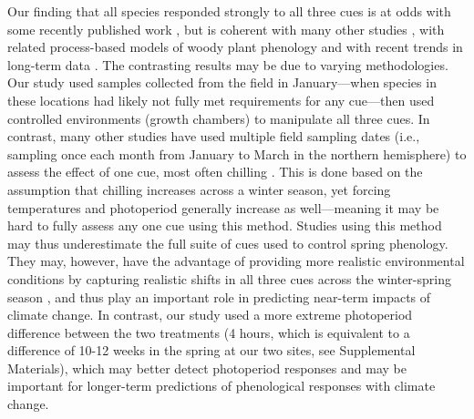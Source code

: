 \documentclass[11pt]{article}
\begin{document}
Our finding that all species responded strongly to all three cues is at odds with some recently published work \citep{Basler:2012aa,laube2014gcb,zohner2016ncc}, but is coherent with many other studies \citep[e.g.,][]{Worrall:1967aa,Heide:1993b}, with related process-based models of woody plant phenology \citep{Chuine:2000,chuine2016} and with recent trends in long-term data \citep[e.g,][]{fu2015,carter2017}. The contrasting results may be due to varying methodologies. Our study used samples collected from the field in January---when species in these locations had likely not fully met requirements for any cue---then used controlled environments (growth chambers) to manipulate all three cues. In contrast, many other studies have used multiple field sampling dates (i.e., sampling once each month from January to March in the northern hemisphere) to assess the effect of one cue, most often chilling \citep{weinberger,laube2014gcb,zohner2017}. This is done based on the assumption that chilling increases across a winter season, yet forcing temperatures and photoperiod generally increase as well---meaning it may be hard to fully assess any one cue using this method. Studies using this method may thus underestimate the full suite of cues used to control spring phenology. They may, however, have the advantage of providing more realistic environmental conditions by capturing realistic shifts in all three cues across the winter-spring season \citep{Basler:2012aa}, and thus play an important role in predicting near-term impacts of climate change. In contrast, our study used a more extreme photoperiod difference between the two treatments (4 hours, which is equivalent to a difference of 10-12 weeks in the spring at our two sites, see Supplemental Materials), which may better detect photoperiod responses and may be important for longer-term predictions of phenological responses with climate change. %
\end{document}
